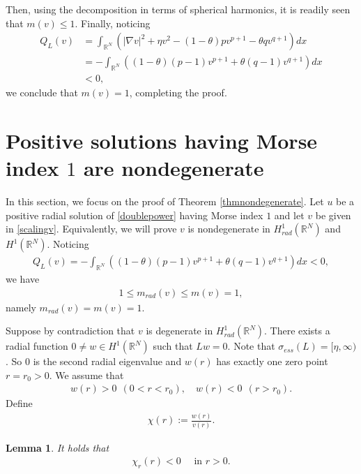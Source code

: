 \documentclass{article}
\newtheorem{lemma}[theorem]{Lemma}
\theoremstyle{definition} \theoremstyle{remark}
\numberwithin{equation}{section}
\newcommand{\R}{\mathbb{R}}
\begin{document}
	Then, using the decomposition in terms of spherical harmonics, it is readily seen that $m(v) \le 1$. Finally, noticing
	\begin{align*}
		Q_L(v) & = \int_{\R^N}\left(|\nabla v|^2 + \eta v^2 - (1-\theta)pv^{p+1} - \theta q v^{q+1}\right)dx \\
		& = -\int_{\R^N}\left((1-\theta)(p-1)v^{p+1} + \theta (q-1) v^{q+1}\right)dx \\
		& < 0,
	\end{align*}
	we conclude that $m(v) = 1$, completing the proof.

	\section{Positive solutions having Morse index $1$ are nondegenerate} \label{secnondegenerate}

	In this section, we focus on the proof of Theorem \ref{thmnondegenerate}. Let $u$ be a positive radial solution of \eqref{doublepower} having Morse index $1$ and let $v$ be given in \eqref{scalingv}. Equivalently, we will prove $v$ is nondegenerate in $H_{rad}^1(\R^N)$ and $H^1(\R^N)$. Noticing
	\begin{align*}
		Q_{L}(v) = -\int_{\R^N}\left((1-\theta)(p-1)v^{p+1} + \theta(q-1)v^{q+1}\right)dx < 0,
	\end{align*}
	we have
	\begin{align*}
		1 \le m_{rad}(v) \le m(v) = 1,
	\end{align*}
	namely $m_{rad}(v) = m(v) = 1$.
	
	Suppose by contradiction that $v$ is degenerate in $H_{rad}^1(\R^N)$. There exists a radial function $0 \neq w \in H^1(\R^N)$ such that $Lw = 0$. Note that $\sigma_{ess}(L) = [\eta,\infty)$. So $0$ is the second radial eigenvalue and $w(r)$ has exactly one zero point $r = r_0 > 0$. We assume that
	\begin{align*}
		w(r) > 0 ~~ (0 < r < r_0),\quad w(r) < 0 ~~ (r > r_0).
	\end{align*}
	Define
	\begin{align*}
		\chi(r) := \frac{w(r)}{v(r)}.
	\end{align*}

	\begin{lemma}
		It holds that
		\begin{align}
			\chi_r(r) < 0 \quad \text{ in } r > 0.
		\end{align}
	\end{lemma}
\end{document}
